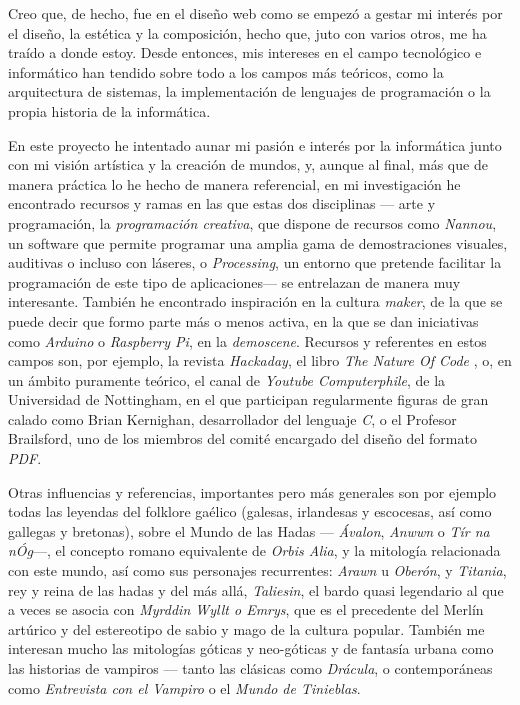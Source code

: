 \documentclass[twoside]{article}
\begin{document}
\begin{multicols}{2}
    Creo que, de hecho, fue en el diseño web como se empezó a gestar mi interés por el diseño, 
    la estética y la composición, hecho que, juto con varios otros, me ha traído a donde 
    estoy. Desde entonces, mis intereses en el campo tecnológico e informático han tendido 
    sobre todo a los campos más teóricos, como la arquitectura de sistemas, la implementación 
    de lenguajes de programación o la propia historia de la informática.
    
    En este proyecto he intentado aunar mi pasión e interés por la informática junto con mi 
    visión artística y la creación de mundos, y, aunque al final, más que de manera práctica 
    lo he hecho de manera referencial, en mi investigación he encontrado recursos y ramas en 
    las que estas dos disciplinas --- arte y programación, la \emph{programación creativa}, 
    que dispone de recursos como \emph{Nannou}\autocite*{nannou}, un software que permite 
    programar una amplia gama de demostraciones visuales, auditivas o incluso con láseres, o 
    \emph{Processing}\autocite*{processing}, un entorno que pretende facilitar la programación 
    de este tipo de aplicaciones--- se entrelazan de manera muy interesante. También he 
    encontrado inspiración en la cultura \emph{maker}, de la que se puede decir que formo 
    parte más o menos activa, en la que se dan iniciativas como \emph{Arduino}\autocite*
    {arduino} o \emph{Raspberry Pi}\autocite*{raspberry}, en la \emph{demoscene}\autocite*
    {demoscene}. Recursos y referentes en estos campos son, por ejemplo, la revista \emph
    {Hackaday}\autocite*{hackaday}, el libro \emph{The Nature Of Code}\autocite*{shiffman2012}
    , o, en un ámbito puramente teórico, el canal de \emph{Youtube Computerphile}, de la Universidad de Nottingham, en el que participan regularmente 
    figuras de gran calado como Brian Kernighan, desarrollador del lenguaje \emph{C}\autocite*
  {cprogramming}, o el Profesor Brailsford, uno de los miembros del comité encargado del 
  diseño del formato \emph{PDF}.
  
  Otras influencias y referencias, importantes pero más generales son por
  ejemplo todas las leyendas del folklore gaélico (galesas, irlandesas y
  escocesas, así como gallegas y bretonas), sobre el Mundo de las Hadas ---
  \emph{Ávalon}, \emph{Anwwn} o \emph{Tír na nÓg}---, el concepto romano
  equivalente de \emph{Orbis Alia}, y la mitología relacionada con este
  mundo, así como sus personajes recurrentes: \emph{Arawn} u
  \emph{Oberón}, y \emph{Titania}, rey y reina de las hadas y del más allá, \emph{Taliesin}, 
  el bardo quasi legendario al que a veces se asocia con \emph{Myrddin Wyllt o Emrys}, que 
  es el precedente del Merlín artúrico y del estereotipo de sabio y mago de la cultura 
  popular. También me interesan mucho las mitologías góticas y neo-góticas y de fantasía 
  urbana como las
  historias de vampiros --- tanto las clásicas como \emph{Drácula}\autocite*{stoker}, o 
  contemporáneas como \emph{Entrevista con el Vampiro}\autocite*{rice1994} o el \emph{Mundo 
  de Tinieblas}\autocite*{achilli2016}.
  

\end{multicols}
\end{document}
